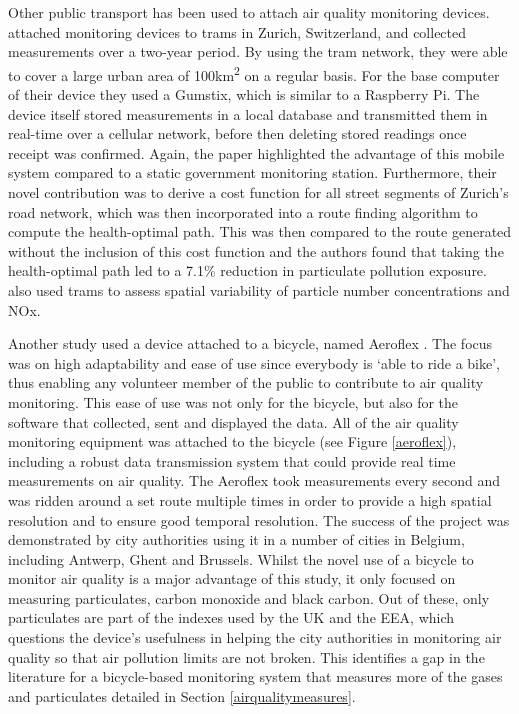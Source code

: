 \documentclass[11pt]{report}
\begin{document}

Other public transport has been used to attach air quality monitoring devices. \cite{Hasenfratz2015highresmapsTram} attached monitoring devices to trams in Zurich, Switzerland, and collected measurements over a two-year period. By using the tram network, they were able to cover a large urban area of 100km\textsuperscript{2} on a regular basis. For the base computer of their device they used a Gumstix, which is similar to a Raspberry Pi.  The device itself stored measurements in a local database and transmitted them in real-time over a cellular network, before then deleting stored readings once receipt was confirmed. Again, the paper highlighted the advantage of this mobile system compared to a static government monitoring station. Furthermore, their novel contribution was to derive a cost function for all street segments of Zurich's road network, which was then incorporated into a route finding algorithm to compute the health-optimal path. This was then compared to the route generated without the inclusion of this cost function and the authors found that taking the health-optimal path led to a 7.1\% reduction in particulate pollution exposure. \cite{Hagemann2014aerotram} also used trams to assess spatial variability of particle number concentrations and NOx.

Another study used a device attached to a bicycle, named Aeroflex \citep{Elen2013aeroflex}. The focus was on high adaptability and ease of use since everybody is `able to ride a bike', thus enabling any volunteer member of the public to contribute to air quality monitoring. This ease of use was not only for the bicycle, but also for the software that collected, sent and displayed the data. All of the air quality monitoring equipment was attached to the bicycle (see Figure \ref{aeroflex}), including a robust data transmission system that could provide real time measurements on air quality. The Aeroflex took measurements every second and was ridden around a set route multiple times in order to provide a high spatial resolution and to ensure good temporal resolution. The success of the project was demonstrated by city authorities using it in a number of cities in Belgium, including Antwerp, Ghent and Brussels. Whilst the novel use of a bicycle to monitor air quality is a major advantage of this study, it only focused on measuring particulates, carbon monoxide and black carbon. Out of these, only particulates are part of the indexes used by the UK and the EEA, which questions the device's usefulness in helping the city authorities in monitoring air quality so that air pollution limits are not broken. This identifies a gap in the literature for a bicycle-based monitoring system that measures more of the gases and particulates detailed in Section \ref{airqualitymeasures}.
\end{document}
